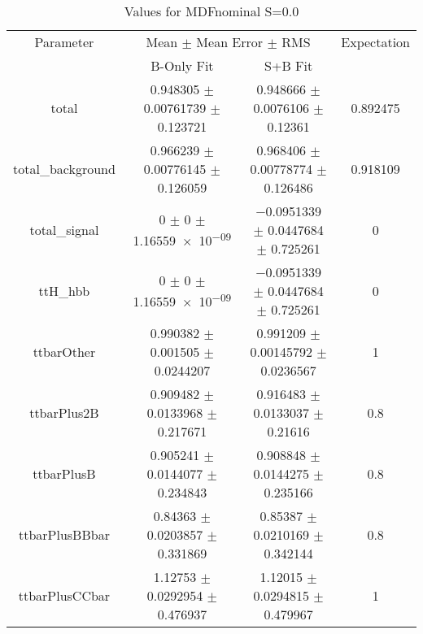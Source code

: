 \begin{table}
\centering
\caption{Values for MDFnominal S=0.0}
\begin{tabular}{cccc}
\toprule
Parameter & \multicolumn{2}{c}{Mean $\pm$ Mean Error $\pm$ RMS} & Expectation\\
 & B-Only Fit & S+B Fit & \\
\midrule
total & \num{0.948305} $\pm$ \num{0.00761739} $\pm$ \num{0.123721} & \num{0.948666} $\pm$ \num{0.0076106} $\pm$ \num{0.12361} & \num{0.892475}\\
total\_background & \num{0.966239} $\pm$ \num{0.00776145} $\pm$ \num{0.126059} & \num{0.968406} $\pm$ \num{0.00778774} $\pm$ \num{0.126486} & \num{0.918109}\\
total\_signal & \num{0} $\pm$ \num{0} $\pm$ \num{1.16559e-09} & \num{-0.0951339} $\pm$ \num{0.0447684} $\pm$ \num{0.725261} & \num{0}\\
ttH\_hbb & \num{0} $\pm$ \num{0} $\pm$ \num{1.16559e-09} & \num{-0.0951339} $\pm$ \num{0.0447684} $\pm$ \num{0.725261} & \num{0}\\
ttbarOther & \num{0.990382} $\pm$ \num{0.001505} $\pm$ \num{0.0244207} & \num{0.991209} $\pm$ \num{0.00145792} $\pm$ \num{0.0236567} & \num{1}\\
ttbarPlus2B & \num{0.909482} $\pm$ \num{0.0133968} $\pm$ \num{0.217671} & \num{0.916483} $\pm$ \num{0.0133037} $\pm$ \num{0.21616} & \num{0.8}\\
ttbarPlusB & \num{0.905241} $\pm$ \num{0.0144077} $\pm$ \num{0.234843} & \num{0.908848} $\pm$ \num{0.0144275} $\pm$ \num{0.235166} & \num{0.8}\\
ttbarPlusBBbar & \num{0.84363} $\pm$ \num{0.0203857} $\pm$ \num{0.331869} & \num{0.85387} $\pm$ \num{0.0210169} $\pm$ \num{0.342144} & \num{0.8}\\
ttbarPlusCCbar & \num{1.12753} $\pm$ \num{0.0292954} $\pm$ \num{0.476937} & \num{1.12015} $\pm$ \num{0.0294815} $\pm$ \num{0.479967} & \num{1}\\
\bottomrule
\end{tabular}
\end{table}